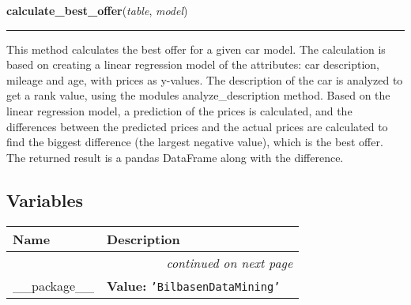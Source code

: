     \label{BilbasenDataMining:datamining:calculate_best_offer}

    \vspace{0.5ex}

\hspace{.8\funcindent}\begin{boxedminipage}{\funcwidth}

    \raggedright \textbf{calculate\_best\_offer}(\textit{table}, \textit{model})

    \vspace{-1.5ex}

    \rule{\textwidth}{0.5\fboxrule}
\setlength{\parskip}{2ex}
    This method calculates the best offer for a given car model. The 
    calculation is based on creating a linear regression model of the 
    attributes: car description, mileage and age, with prices as y-values. 
    The description of the car is analyzed to get a rank value, using the 
    modules analyze\_description method. Based on the linear regression 
    model, a prediction of the prices is calculated, and the differences 
    between the predicted prices and the actual prices are calculated to 
    find the biggest difference (the largest negative value), which is the 
    best offer. The returned result is a pandas DataFrame along with the 
    difference.

\setlength{\parskip}{1ex}
    \end{boxedminipage}



  \subsection{Variables}

    \vspace{-1cm}
\hspace{\varindent}\begin{longtable}{|p{\varnamewidth}|p{\vardescrwidth}|l}
\cline{1-2}
\cline{1-2} \centering \textbf{Name} & \centering \textbf{Description}& \\
\cline{1-2}
\endhead\cline{1-2}\multicolumn{3}{r}{\small\textit{continued on next page}}\\\endfoot\cline{1-2}
\endlastfoot\raggedright \_\-\_\-p\-a\-c\-k\-a\-g\-e\-\_\-\_\- & \raggedright \textbf{Value:} 
{\tt \texttt{'}\texttt{BilbasenDataMining}\texttt{'}}&\\
\cline{1-2}
\end{longtable}

